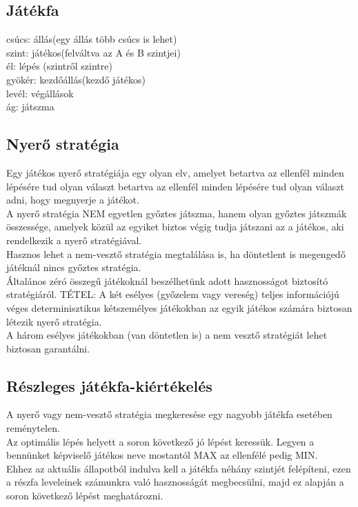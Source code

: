 \documentclass{article}
\begin{document}
	 \newpage
	 \subsection{Játékfa}
	 csúcs: állás(egy állás több csúcs is lehet)\\
	 szint: játékos(felváltva az A és B szintjei)\\
	 él: lépés (szintről szintre)\\
	 gyökér: kezdőállás(kezdő játékos)\\
	 levél: végállások\\
	 ág: játszma\\
	 
	 \subsection{Nyerő stratégia}
	 Egy játékos nyerő stratégiája egy olyan elv, amelyet betartva az ellenfél minden lépésére tud olyan választ betartva az ellenfél minden lépésére tud olyan választ adni, hogy megnyerje a játékot.\\
	 A nyerő stratégia NEM egyetlen győztes játszma, hanem olyan győztes játszmák összessége, amelyek közül az egyiket biztos végig tudja játszani az a játékos, aki rendelkezik a nyerő stratégiával.\\
	 Hasznos lehet a nem-vesztő stratégia megtalálása is, ha döntetlent is megengedő játéknál nincs győztes stratégia.\\
	 Általános zéró összegű játékoknál beszélhetünk adott hasznosságot biztosító stratégiáról.
	 TÉTEL:
	 A két esélyes (győzelem vagy vereség) teljes információjú véges determinisztikus kétszemélyes játékokban az egyik játékos számára biztosan létezik nyerő stratégia.\\
	 A három esélyes játékokban (van döntetlen is) a nem vesztő stratégiát lehet biztosan garantálni.\\
	 
	 \subsection{Részleges játékfa-kiértékelés}
	 A nyerő vagy nem-vesztő stratégia megkeresése egy nagyobb játékfa esetében reménytelen.\\
	 Az optimális lépés helyett a soron következő jó lépést keressük. Legyen a bennünket képviselő játékos neve mostantól MAX az ellenfélé pedig MIN.\\
	 Ehhez az aktuális állapotból indulva kell a játékfa néhány szintjét felépíteni, ezen a részfa leveleinek számunkra való hasznosságát megbecsülni, majd ez alapján a soron következő lépést meghatározni.\\
	 
\end{document}
